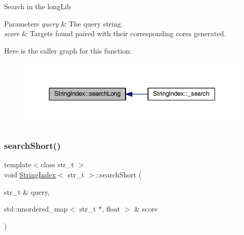 Search in the long\+Lib 
\begin{DoxyParams}{Parameters}
{\em query} & The query string. \\
\hline
{\em score} & Targets found paired with their corresponding cores generated. \\
\hline
\end{DoxyParams}
Here is the caller graph for this function\+:
\nopagebreak
\begin{figure}[H]
\begin{center}
\leavevmode
\includegraphics[width=345pt]{class_string_index_a80ddf83f3f207004142458317609c6d6_icgraph}
\end{center}
\end{figure}
\mbox{\label{class_string_index_a309f7697439fb3428de3c63dca6cdaa4}} 
\subsubsection{\texorpdfstring{search\+Short()}{searchShort()}}
{\footnotesize\ttfamily template$<$class str\+\_\+t $>$ \\
void \mbox{\hyperlink{class_string_index}{String\+Index}}$<$ str\+\_\+t $>$\+::search\+Short (\begin{DoxyParamCaption}\item[{str\+\_\+t \&}]{query,  }\item[{std\+::unordered\+\_\+map$<$ str\+\_\+t $\ast$, float $>$ \&}]{score }\end{DoxyParamCaption})}

